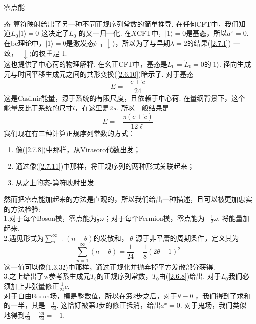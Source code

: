 \centerline{\Large 零点能}
态-算符映射给出了另一种不同正规序列常数的简单推导. 在任何CFT中，我们知道$L_{0}|1\rangle=0$ 这决定了$L_0$ 的又一归一化.
在$X$CFT中，$|1\rangle=0$是基态，所以$a^x=0$. 在bc理论中，$|1\rangle=0$是激发态$b_{-1}|\downarrow\rangle$，所以为了与早期$\lambda=2$的结果(\ref{2.7.1}) 一致， $|\downarrow\rangle$的权重是-1.\\
这也提供了中心荷的物理解释. 在幺正CFT中，基态是$L_{0}=\tilde{L}_{0}=0$的$|1\rangle$. 径向生成元与时间平移生成元之间的共形变换(\ref{2.6.10})暗示了. 对于基态
\begin{equation}
E=-\frac{c+\tilde{c}}{24}
\end{equation}
这是Casimir能量，源于系统的有限尺度，且依赖于中心荷. 在量纲背景下，这个能量反比于系统的尺寸$l$，在这里是$2\pi$. 所以一般结果是
\begin{equation}
E=-\frac{\pi(c+\tilde{c})}{12 \ell}
\end{equation}
我们现在有三种计算正规序列常数的方式：
\begin{enumerate}
	\item 像(\ref{2.7.8})中那样，从Virasoro代数出发；
	\item 通过像(\ref{2.7.11})中那样，将正规序列的两种形式关联起来；
	\item 从之上的态-算符映射出发.
\end{enumerate}
然而把零点能加起来的方法是直观的，所以我们给出一种描述，且可以被更加忠实的方法检验:\\
1.对于每个Boson模，零点能为$\frac{1}{2} \omega$；对于每个Fermion模，零点能为$-\frac{1}{2} \omega$. 将能量加起来.\\
2.遇见形式为$\sum_{n=1}^{\infty}(n-\theta)$的发散和， $\theta$  源于非平庸的周期条件，定义其为
\begin{equation}
\sum_{n=1}^{\infty}(n-\theta)=\frac{1}{24}-\frac{1}{8}(2 \theta-1)^{2}
\end{equation}
这一值可以像(1.3.32)中那样，通过正规化并抛弃掉平方发散部分获得.\\
3.之上给出了w参考系生成元$T_0$的正规序列常数，$T_0$由(\ref{2.6.8})给出. 对于$L_0$我们必须加上非张量修正$\frac{1}{24} c$. \\
对于自由Boson场，模是整数值，所以在第2步之后，对于$\theta=0$ ，我们得到了求和的一半，其是$-\frac{1}{24} $. 这恰好被第3步的修正抵消，给出$a^x=0$. 对于鬼场，我们类似地得到$\frac{2}{24}-\frac{26}{24}=-1$.
